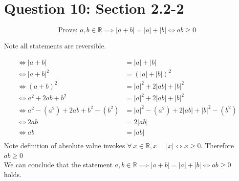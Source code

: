 \documentclass[11pt]{article}
\theoremstyle{plain}
\begin{document}
\section*{Question 10: Section 2.2-2}
\[ \text{Prove: } a,b \in \mathbb{R} \implies  |a+b| = |a|+|b| \iff ab \geq 0 \]
\begin{center}
	Note all statements are reversible.
\end{center}
\[
	\begin{aligned}
		\iff |a+b|                   & = |a|+|b|                             \\
		\iff |a+b|^2                 & = (|a|+|b|)^2                         \\
		\iff (a+b)^2                 & = |a|^2 + 2|ab| + |b|^2               \\
		\iff a^2+2ab+b^2             & = |a|^2 + 2|ab| + |b|^2               \\
		\iff a^2-(a^2)+2ab+b^2-(b^2) & = |a|^2 -(a^2) + 2|ab| + |b|^2 -(b^2) \\
		\iff 2ab                     & = 2|ab|                               \\
		\iff ab                      & = |ab|                                \\
	\end{aligned}
\]
Note definition of absolute value invokes $\forall ~x \in \mathbb{R}, x = |x| \iff x \geq 0$. Therefore $ab \geq 0$ \\
We can conclude that the statement $a,b \in \mathbb{R} \implies  |a+b| = |a|+|b| \iff ab \geq 0$ holds.
\end{document}
